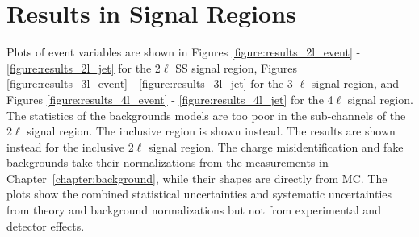 \section{Results in Signal Regions}
Plots of event variables are shown in Figures \ref{figure:results_2l_event} - \ref{figure:results_2l_jet} for the 2$\ell$ SS signal region, Figures \ref{figure:results_3l_event} - \ref{figure:results_3l_jet} for the 3 $\ell$ signal
region, and Figures \ref{figure:results_4l_event} - \ref{figure:results_4l_jet} for the 4$\ell$ signal region. The statistics of the backgrounds models are too poor in the sub-channels of the  2$\ell$ signal region. The inclusive region is shown instead. The results are shown instead for the inclusive 2$\ell$ signal region. The charge misidentification and fake backgrounds take their normalizations from the measurements in Chapter~\ref{chapter:background}, while their shapes are directly from MC. The plots show the combined statistical uncertainties and systematic uncertainties from theory and background normalizations but not from experimental and detector effects. 


